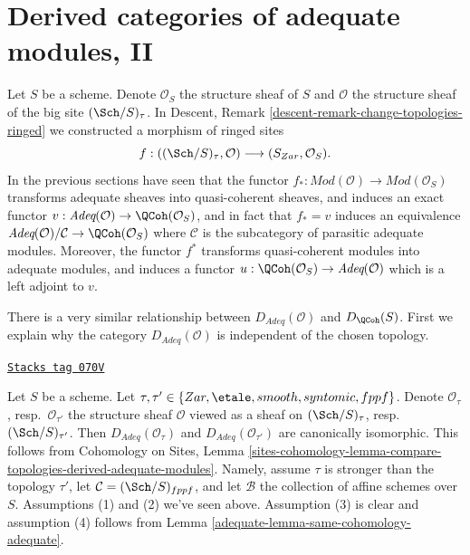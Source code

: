 \section{Derived categories of adequate modules, II}
\label{adequate-section-derived-categories}
Let $S$ be a scheme. Denote $\mathcal{O}_S$ the structure sheaf of $S$
and $\mathcal{O}$ the structure sheaf of the big site $(\Sch/S)_\tau$.
In
Descent, Remark \ref{descent-remark-change-topologies-ringed}
we constructed a morphism of ringed sites
\begin{equation}
\label{equation-compare-big-small}
f :
((\Sch/S)_\tau, \mathcal{O})
\longrightarrow
(S_{Zar}, \mathcal{O}_S).
\end{equation}
In the previous sections have seen that the functor
$f_* : \textit{Mod}(\mathcal{O}) \to \textit{Mod}(\mathcal{O}_S)$
transforms adequate sheaves into quasi-coherent sheaves, and
induces an exact functor
$v : \textit{Adeq}(\mathcal{O}) \to \QCoh(\mathcal{O}_S)$, and
in fact that $f_* = v$ induces an equivalence
$\textit{Adeq}(\mathcal{O})/\mathcal{C} \to \QCoh(\mathcal{O}_S)$
where $\mathcal{C}$ is the subcategory of parasitic adequate modules.
Moreover, the functor $f^*$ transforms quasi-coherent modules
into adequate modules, and induces a functor
$u : \QCoh(\mathcal{O}_S) \to \textit{Adeq}(\mathcal{O})$
which is a left adjoint to $v$.

\medskip\noindent
There is a very similar relationship between
$D_{\textit{Adeq}}(\mathcal{O})$ and $D_\QCoh(S)$.
First we explain why the category $D_{\textit{Adeq}}(\mathcal{O})$
is independent of the chosen topology.

\begin{remark}
\label{adequate-remark-D-adeq-independence-topology}
\href{https://stacks.math.columbia.edu/tag/070V}{\texttt{Stacks tag 070V}}

Let $S$ be a scheme.
Let $\tau, \tau' \in \{Zar, \etale, smooth, syntomic, fppf\}$.
Denote $\mathcal{O}_\tau$, resp.\ $\mathcal{O}_{\tau'}$
the structure sheaf $\mathcal{O}$ viewed as a sheaf on
$(\Sch/S)_\tau$, resp.\ $(\Sch/S)_{\tau'}$.
Then $D_{\textit{Adeq}}(\mathcal{O}_\tau)$ and
$D_{\textit{Adeq}}(\mathcal{O}_{\tau'})$ are canonically isomorphic.
This follows from Cohomology on Sites, Lemma
\ref{sites-cohomology-lemma-compare-topologies-derived-adequate-modules}.
Namely, assume $\tau$ is stronger than the topology $\tau'$, let
$\mathcal{C} = (\Sch/S)_{fppf}$, and let $\mathcal{B}$ the collection
of affine schemes over $S$. Assumptions (1) and (2) we've seen above.
Assumption (3) is clear and assumption (4) follows from
Lemma \ref{adequate-lemma-same-cohomology-adequate}.
\end{remark}

